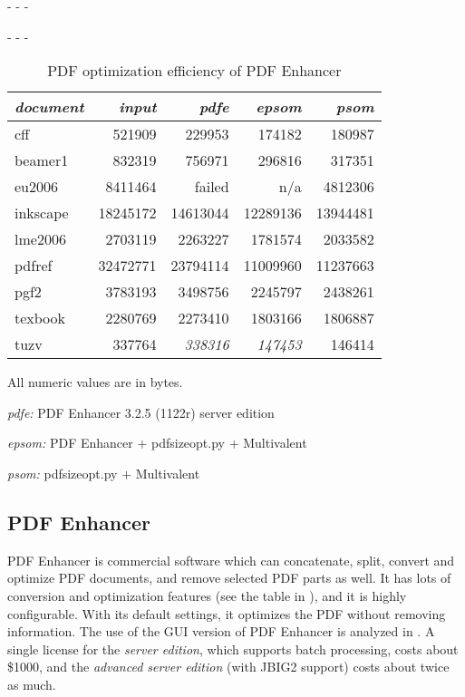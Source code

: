 \documentclass{ltugproc}
\def\cmd{\textsf}
\def\captiontop#1{%
  \advance\abovecaptionskip-\belowcaptionskip
  \advance\belowcaptionskip\abovecaptionskip
  \advance\abovecaptionskip-\belowcaptionskip
  \abovecaptionskip-\abovecaptionskip
  \caption{#1}%
  \advance\abovecaptionskip-\belowcaptionskip
  \advance\belowcaptionskip\abovecaptionskip
  \advance\abovecaptionskip-\belowcaptionskip
  \abovecaptionskip-\abovecaptionskip
}
\begin{document}
\begin{table}
\captiontop{PDF optimization efficiency
of PDF Enhancer}\label{tab:eff-pdfe}
\par\small\noindent\hfil
\advance\tabcolsep-2pt  %
\begin{tabular}{@{}lrrrr@{}}
\toprule
\emph{document} & \emph{input} & \emph{pdfe} & \emph{epsom} & \emph{psom} \\\midrule
cff         &   521909 &   229953 &   174182 &   180987 \\
beamer1     &   832319 &   756971 &   296816 &   317351 \\
eu2006      &  8411464 &  failed  & n/a      &  4812306 \\
inkscape    & 18245172 & 14613044 & 12289136 & 13944481 \\
lme2006     &  2703119 &  2263227 &  1781574 &  2033582 \\
pdfref      & 32472771 & 23794114 & 11009960 & 11237663 \\
pgf2        &  3783193 &  3498756 &  2245797 &  2438261 \\
texbook     &  2280769 &  2273410 &  1803166 &  1806887 \\
tuzv        &   337764 &   \emph{338316} &   \emph{147453} &   146414 \\
\bottomrule
\end{tabular}
\par\bigskip
\par\noindent All numeric values are in bytes.
\par\noindent\emph{pdfe:} PDF Enhancer 3.2.5 (1122r) server edition
\par\noindent\emph{epsom:} PDF Enhancer $+$ \cmd{pdfsizeopt.py} $+$ Multivalent
\par\noindent\emph{psom:} \cmd{pdfsizeopt.py} $+$ Multivalent
\end{table}


\subsection{PDF Enhancer}

PDF Enhancer \cite{pdfenhancer} is commercial software which can
concatenate, split, convert and optimize PDF documents, and remove selected
PDF parts as well. It has lots of conversion and optimization features (see
the table in \cite{pdfenhancer-features}), and it is highly configurable.
With its default settings, it optimizes the PDF without removing
information. The use of the GUI version of PDF Enhancer is analyzed in
\cite{pdftweak}. A single license for the \emph{server edition}, which
supports batch processing, costs about \$1000, and the \emph{advanced server
edition} (with JBIG2 support) costs about twice as much.
\end{document}
